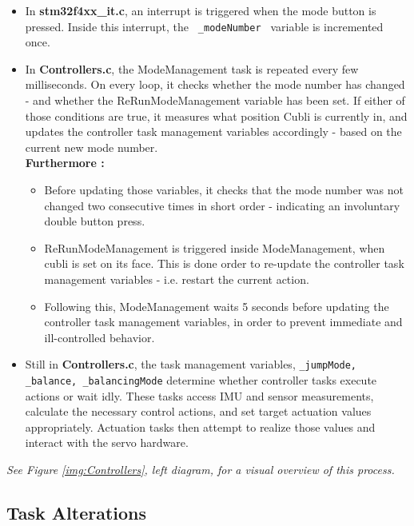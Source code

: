 \begin{itemize}
\item In \textbf{stm32f4xx\_it.c}, an interrupt is triggered when the mode button is pressed. Inside this interrupt, the \texttt{ \_modeNumber } variable is incremented once.

\item In \textbf{Controllers.c}, the ModeManagement task is repeated every few milliseconds. On every loop, it checks whether the mode number has changed - and whether the ReRunModeManagement variable has been set. If either of those conditions are true, it measures what position Cubli is currently in, and updates the controller task management variables accordingly - based on the current new mode number.\\

\textbf{Furthermore :} 
\begin{itemize}
\item[] Before updating those variables, it checks that the mode number was not changed two consecutive times in short order - indicating an involuntary double button press.
\item[] ReRunModeManagement is triggered inside ModeManagement, when cubli is set on its face. This is done order to re-update the controller task management variables - i.e. restart the current action. 
\item[] Following this, ModeManagement waits 5 seconds before updating the controller task management variables, in order to prevent immediate and ill-controlled behavior.
\end{itemize}

\item Still in \textbf{Controllers.c}, the task management variables, \texttt{\_jumpMode, \_balance, \_balancingMode} determine whether controller tasks execute actions or wait idly. These tasks access IMU and sensor measurements, calculate the necessary control actions, and set target actuation values appropriately. Actuation tasks then attempt to realize those values and interact with the servo hardware.
\end{itemize}

\textit{See Figure \ref{img:Controllers}, left diagram, for a visual overview of this process.}


\subsection{Task Alterations}

